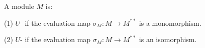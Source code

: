 A module $M$ is:

(1) $U$- if the evaluation map $\sigma_M: M \to M^{**}$ is a monomorphism.

(2) $U$- if the evaluation map $\sigma_M: M \to M^{**}$ is an isomorphism.
